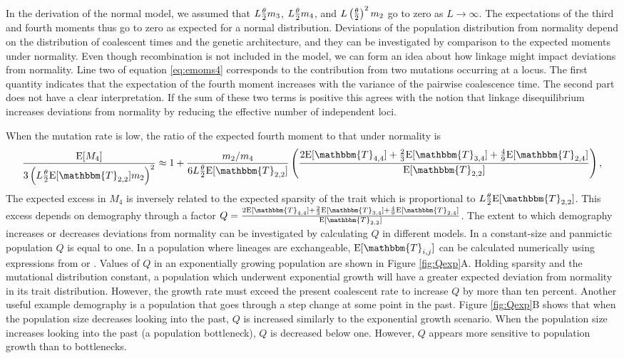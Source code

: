 In the derivation of the normal model, we assumed that $L\frac{\theta}{2} m_3$, $L \frac{\theta}{2} m_4$,
and $L \left( \frac{\theta}{2} \right)^2 m_2$ go to zero as $L\to \infty$. The expectations of
the third and fourth moments thus go to zero as expected for a normal
distribution. Deviations of the population distribution from normality depend on
the distribution of coalescent times and the genetic architecture, and they can
be investigated by comparison to the expected moments under normality. Even
though recombination is not included in the model, we can form an idea about how
linkage might impact deviations from normality. Line two of
equation \eqref{eq:emoms4} corresponds to the contribution from two mutations
occurring at a locus. The first quantity indicates that the expectation of the
fourth moment increases with the variance of the pairwise coalescence time. The
second part does not have a clear interpretation. If the sum of these two terms
is positive this agrees with the notion that linkage disequilibrium increases
deviations from normality by reducing the effective number of independent loci.

When the mutation rate is low, the ratio of the expected fourth moment to that
under normality is
\begin{equation}
  \label{eq:popmom4coal}
  \frac{\E[M_4]}{3\left(L \T \E[\mathbbm{T}_{2,2}] m_2\right)^2} \approx 1 +
  \frac{m_2/m_4}{6 L \T \E[\mathbbm{T}_{2,2}]}\left( \frac{2\E[\mathbbm{T}_{4,4}] +
      \frac{2}{3}\E[\mathbbm{T}_{3,4}] +
      \frac{4}{9}\E[\mathbbm{T}_{2,4}]}{\E[\mathbbm{T}_{2,2}]}\right),
\end{equation}
The expected excess in $M_4$ is inversely related to the expected sparsity of
the trait which is proportional to $L \T \E[\mathbbm{T}_{2,2}]$. This excess
depends on demography through a factor $Q = \frac{2\E[\mathbbm{T}_{4,4}]
+ \frac{2}{3}\E[\mathbbm{T}_{3,4}]
+ \frac{4}{9}\E[\mathbbm{T}_{2,4}]}{\E[\mathbbm{T}_{2,2}]}$. The extent to which
demography increases or decreases deviations from normality can be investigated
by calculating $Q$ in different models. In a constant-size and panmictic
population $Q$ is equal to one. In a population where lineages are exchangeable,
$\E[\mathbbm{T}_{i,j}]$ can be calculated numerically using expressions from
\citet{Griffiths1998} or \citet{Polanski2003a}. Values of $Q$ in an exponentially growing population are
shown in Figure \ref{fig:Qexp}A. Holding sparsity and the mutational
distribution constant, a population which underwent exponential growth will have
a greater expected deviation from normality in its trait distribution. However,
the growth rate must exceed the present coalescent rate to increase $Q$ by more
than ten percent. Another useful example demography is a population that goes
through a step change at some point in the past. Figure \ref{fig:Qexp}B shows
that when the population size decreases looking into the past, $Q$ is increased
similarly to the exponential growth scenario. When the population size increases
looking into the past (a population bottleneck), $Q$ is decreased below one.
However, $Q$ appears more sensitive to population growth than to bottlenecks.

